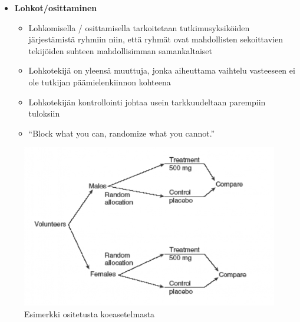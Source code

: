 \documentclass[
]{book}
\providecommand{\tightlist}{%
  \setlength{\itemsep}{0pt}\setlength{\parskip}{0pt}}
\begin{document}
\hfill\break

\begin{itemize}
\tightlist
\item
  \textbf{Lohkot/osittaminen}

  \begin{itemize}
  \tightlist
  \item
    Lohkomisella / osittamisella tarkoitetaan tutkimusyksiköiden järjestämistä ryhmiin niin, että ryhmät ovat mahdollisten sekoittavien tekijöiden suhteen mahdollisimman samankaltaiset
  \item
    Lohkotekijä on yleensä muuttuja, jonka aiheuttama vaihtelu vasteeseen ei ole tutkijan päämielenkiinnon kohteena
  \item
    Lohkotekijän kontrollointi johtaa usein tarkkuudeltaan parempiin tuloksiin
  \item
    ``Block what you can, randomize what you cannot.''
  \end{itemize}
\end{itemize}

\begin{figure}

{\centering \includegraphics[width=1\linewidth]{images/block} 

}

\caption{Esimerkki ositetusta koeasetelmasta}\label{fig:block}
\end{figure}
\end{document}
